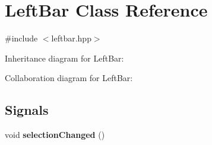 \hypertarget{classLeftBar}{}\section{Left\+Bar Class Reference}
\label{classLeftBar}


{\ttfamily \#include $<$leftbar.\+hpp$>$}



Inheritance diagram for Left\+Bar\+:


Collaboration diagram for Left\+Bar\+:
\subsection*{Signals}
\begin{DoxyCompactItemize}
\item 
void {\bfseries selection\+Changed} ()\hypertarget{classLeftBar_a275ebb41e43eb2592fa245e5b366c727}{}\label{classLeftBar_a275ebb41e43eb2592fa245e5b366c727}

\end{DoxyCompactItemize}
